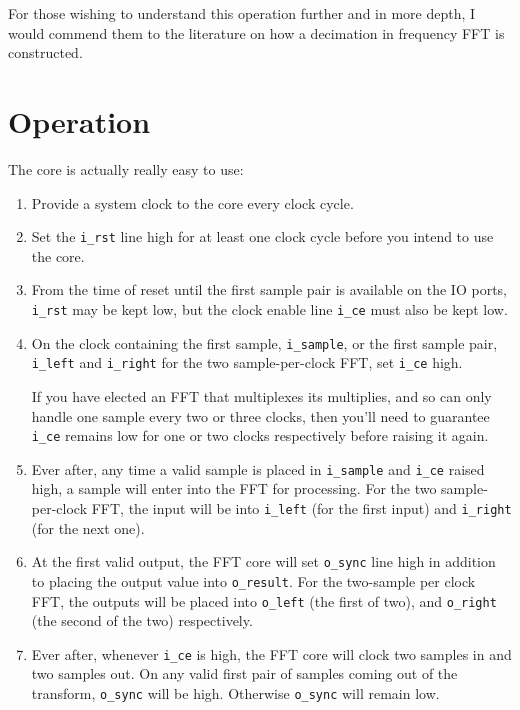 \documentclass{gqtekspec}
\begin{document}
For those wishing to understand this operation further and in more depth, I
would commend them to the literature on how a decimation in frequency FFT is
constructed.

\chapter{Operation}

The core is actually really easy to use:
\begin{enumerate}
	\item Provide a system clock to the core every clock cycle.
	\item Set the {\tt i\_rst} line high for at least one clock cycle
		before you intend to use the core.
	\item From the time of reset until the first sample pair is available
		on the IO ports, {\tt i\_rst} may be kept low, but the clock
		enable line {\tt i\_ce} must also be kept low.

	\item On the clock containing the first sample, {\tt i\_sample}, or the
		first sample pair, {\tt i\_left} and {\tt i\_right} for the
		two sample-per-clock FFT, set {\tt i\_ce} high.

		If you have elected an FFT that multiplexes its multiplies,
		and so can only handle one sample every two or three clocks,
		then you'll need to guarantee {\tt i\_ce} remains low for
		one or two clocks respectively before raising it again.

	\item Ever after, any time a valid sample is placed in {\tt i\_sample}
		and {\tt i\_ce} raised high, a sample will enter into the
		FFT for processing.  For the two sample-per-clock FFT, the
		input will be into {\tt i\_left} (for the first input)
		and {\tt i\_right} (for the next one).

	\item At the first valid output, the FFT core will set {\tt o\_sync}
		line high in addition to placing the output value into
		{\tt o\_result}.  For the two-sample per clock FFT, the outputs
		will be placed into {\tt o\_left}
		(the first of two), and {\tt o\_right} (the second of the two)
		respectively.

	\item Ever after, whenever {\tt i\_ce} is high, the FFT core will clock
		two samples in and two samples out.  On any valid first
		pair of samples coming out of the transform,
		{\tt o\_sync} will be high.  Otherwise {\tt o\_sync} will
		remain low.
\end{enumerate}
\end{document}
